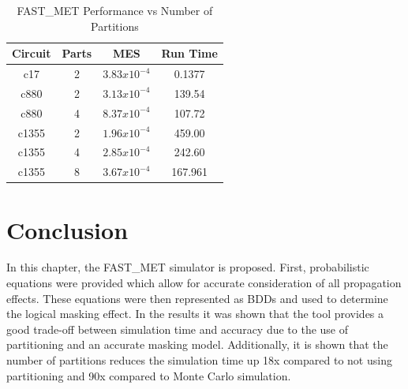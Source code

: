 \begin{table}[ht]
	\begin{center}
		\caption{FAST\_MET Performance vs Number of Partitions}
		\label{table:restable}
		\begin{tabular}{|c|c|c|c|}
			\hline
			Circuit& Parts & MES & Run Time\\ 
			\hline
			c17 & 2 & $3.83x10^{-4}$ & 0.1377\\
			\hline
			c880 & 2 & $3.13x10^{-4}$ & 139.54\\
			\hline
			c880 & 4 & $8.37x10^{-4}$ & 107.72\\
			\hline
			c1355 & 2 & $1.96x10^{-4}$ & 459.00\\
			\hline
			c1355 & 4 & $2.85x10^{-4}$ & 242.60\\
			\hline
			c1355 & 8 & $3.67x10^{-4}$ & 167.961\\
			\hline
		\end{tabular}
	\end{center}
\end{table}

\section{Conclusion}
In this chapter, the FAST\_MET simulator is proposed. First, probabilistic equations were provided which allow for accurate consideration of all propagation effects. These equations were then represented as BDDs and used to determine the logical masking effect. In the results it was shown that the tool provides a good trade-off between simulation time and accuracy due to the use of partitioning and an accurate masking model. Additionally, it is shown that the number of partitions reduces the simulation time up 18x compared to not using partitioning and 90x compared to Monte Carlo simulation.
